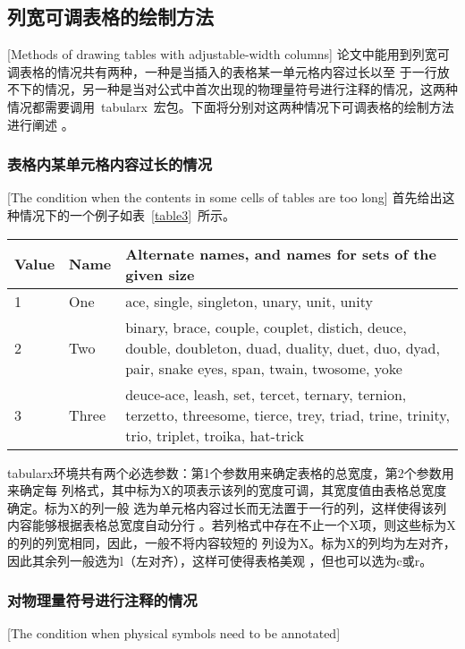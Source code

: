 \subsection{列宽可调表格的绘制方法}[Methods of drawing tables with adjustable-width columns]
论文中能用到列宽可调表格的情况共有两种，一种是当插入的表格某一单元格内容过长以至
于一行放不下的情况，另一种是当对公式中首次出现的物理量符号进行注释的情况，这两种
情况都需要调用~tabularx~宏包。下面将分别对这两种情况下可调表格的绘制方法进行阐述
。
\subsubsection{表格内某单元格内容过长的情况}[The condition when the contents in
some cells of tables are too long]
首先给出这种情况下的一个例子如表~\ref{table3}~所示。
\begin{table}[htbp]
  \centering
{}\vspace{0.5em}\wuhao
\begin{tabularx}{0.7\textwidth}{llX}
\toprule[1.5pt]
Value & Name & Alternate names, and names for sets of the given size\\\midrule[1pt]
1 & One & ace, single, singleton, unary, unit, unity\\
2 & Two & binary, brace, couple, couplet, distich, deuce, double, doubleton, duad, duality, duet, duo, dyad, pair, snake eyes, span, twain, twosome, yoke\\
3 & Three & deuce-ace, leash, set, tercet, ternary, ternion, terzetto, threesome, tierce, trey, triad, trine, trinity, trio, triplet, troika, hat-trick\\\bottomrule[1.5pt]
\end{tabularx}
\end{table}
tabularx环境共有两个必选参数：第1个参数用来确定表格的总宽度，第2个参数用来确定每
列格式，其中标为X的项表示该列的宽度可调，其宽度值由表格总宽度确定。标为X的列一般
选为单元格内容过长而无法置于一行的列，这样使得该列内容能够根据表格总宽度自动分行
。若列格式中存在不止一个X项，则这些标为X的列的列宽相同，因此，一般不将内容较短的
列设为X。标为X的列均为左对齐，因此其余列一般选为l（左对齐），这样可使得表格美观
，但也可以选为c或r。

\subsubsection{对物理量符号进行注释的情况}[The condition when physical symbols
need to be annotated]

